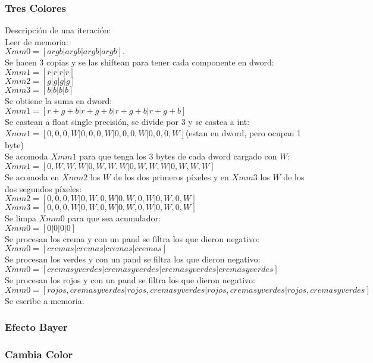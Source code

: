 \subsubsection{Tres Colores}
Descripción de una iteración:\\
Leer de memoria:\\
$Xmm0 = [argb| argb| argb | argb].$\\
Se hacen 3 copias y se las shiftean para tener cada componente en dword:\\ 
$Xmm1 = [r| r| r| r]$\\
$Xmm2 = [g| g| g| g]$\\
$Xmm3 = [b| b| b| b]$\\
Se obtiene la suma en dword:\\
$Xmm1 = [r+g+b| r+g+b| r+g+b| r+g+b]$\\
Se castean a float single precisión, se divide por 3 y se castea a int:\\
$Xmm1 = [0,0,0,W| 0,0,0,W| 0,0,0,W| 0,0,0,W]$(estan en dword, pero ocupan 1 byte)\\
Se acomoda $Xmm1$ para que tenga los 3 bytes de cada dword cargado con $W$:\\
$Xmm1 = [0,W,W,W| 0,W,W,W| 0,W,W,W| 0,W,W,W]$\\
Se acomoda en $Xmm2$ los $W$ de los dos primeros píxeles y en $Xmm3$ los $W$ de los dos segundos píxeles:\\
$Xmm2 = [0,0,0,W|0,W,0,W|0,W,0,W|0,W,0,W]$\\
$Xmm3 = [0,0,0,W|0,W,0,W|0,W,0,W|0,W,0,W]$\\
Se limpa $Xmm0$ para que sea acumulador:\\
$Xmm0 = [0|0|0|0]$\\
Se procesan los crema y con un pand se filtra los que dieron negativo:\\
$Xmm0 = [cremas|cremas|cremas|cremas]$\\
Se procesan los verdes y con un pand se filtra los que dieron negativo:\\
$Xmm0 = [cremas y verdes|cremas y verdes|cremas y verdes|cremas y verdes]$\\
Se procesan los rojos y con un pand se filtra los que dieron negativo:\\
$Xmm0 = [rojos, cremas y verdes|rojos, cremas y verdes|rojos, cremas y verdes|rojos, cremas y verdes]$\\
Se escribe a memoria.\\
\subsubsection{Efecto Bayer}

\subsubsection{Cambia Color}